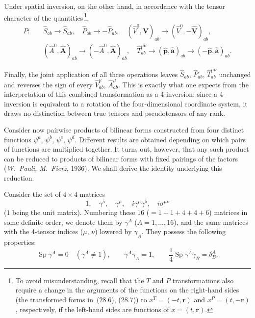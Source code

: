 Under spatial inversion, on the other hand, in accordance with the tensor character of the quantities\,\footnote{To avoid misunderstanding, recall that the $T$ and $P$ transformations also require a change in the arguments of the functions on the right-hand sides (the transformed forms in~(28.6), (28.7)) to $x^T = (-t,\mathbf{r})$ and $x^P = (t,-\mathbf{r})$, respectively, if the left-hand sides are functions of $x = (t,\mathbf{r})$.},
\begin{equation}
\begin{aligned}
P:\quad &\widehat S_{ab} \to \widehat S_{ab},\quad \widehat P_{ab} \to -\widehat P_{ab},\quad (\widehat V^0,\widehat{\mathbf{V}})_{ab} \to (\widehat V^0,-\widehat{\mathbf{V}})_{ab},\\
&(\widehat A^0,\widehat{\mathbf{A}})_{ab} \to (-\widehat A^0,\widehat{\mathbf{A}})_{ab},\quad \widehat T^{\mu\nu}_{ab} \to (\widehat{\mathbf{p}},\widehat{\mathbf{a}})_{ab} \to (-\widehat{\mathbf{p}},\widehat{\mathbf{a}})_{ab}.
\end{aligned}
\tag{28.7}
\end{equation}

Finally, the joint application of all three operations leaves $\widehat S_{ab}$, $\widehat P_{ab}$, $\widehat T^{\mu\nu}_{ab}$ unchanged and reverses the sign of every $\widehat V^\mu_{ab}$, $\widehat A^\mu_{ab}$. This is exactly what one expects from the interpretation of this combined transformation as a 4-inversion: since a 4-inversion is equivalent to a rotation of the four-dimensional coordinate system, it draws no distinction between true tensors and pseudotensors of any rank.

Consider now pairwise products of bilinear forms constructed from four distinct functions $\psi^a$, $\psi^b$, $\psi^c$, $\psi^d$. Different results are obtained depending on which pairs of functions are multiplied together. It turns out, however, that any such product can be reduced to products of bilinear forms with fixed pairings of the factors (\emph{W.~Pauli, M.~Fierz}, 1936). We shall derive the identity underlying this reduction.

Consider the set of $4 \times 4$ matrices
\begin{equation}
1,\quad \gamma^5,\quad \gamma^\mu,\quad i\gamma^\mu\gamma^5,\quad i\sigma^{\mu\nu}
\tag{28.8}
\end{equation}
($1$ being the unit matrix). Numbering these $16$ ($= 1 + 1 + 4 + 4 + 6$) matrices in some definite order, we denote them by $\gamma^A$ ($A = 1,\ldots,16$), and the same matrices with the 4-tensor indices ($\mu$, $\nu$) lowered by $\gamma_A$. They possess the following properties:
\begin{equation}
\operatorname{Sp}\gamma^A = 0\quad (\gamma^A \neq 1),\qquad \gamma^A\gamma_A = 1,\qquad \frac{1}{4}\operatorname{Sp}\gamma^A\gamma_B = \delta^A_B.
\tag{28.9}
\end{equation}

